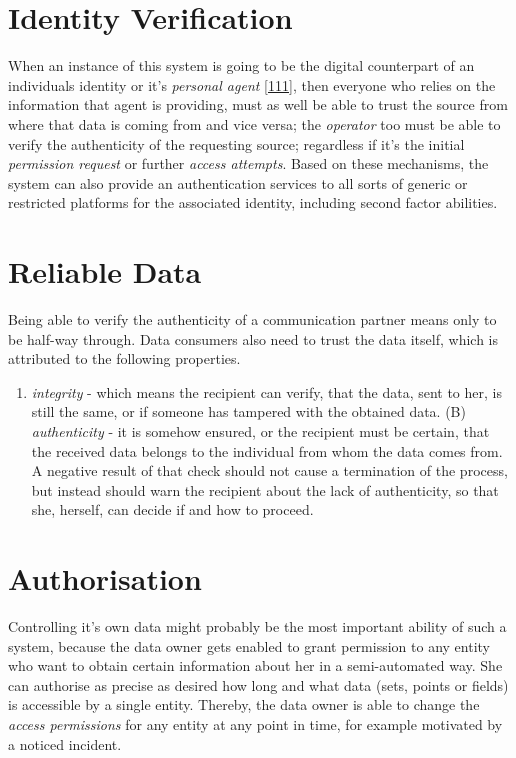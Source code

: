 \documentclass[12pt,english,a4paper,titlepage,cleardoublepage=empty,dottedtoc]{report}
\providecommand{\tightlist}{%
  \setlength{\itemsep}{0pt}\setlength{\parskip}{0pt}}
\begin{document}
\section{Identity Verification}\label{identity-verification}

When an instance of this system is going to be the digital counterpart
of an individuals identity or it's \emph{personal agent}
{[}\protect\hyperlink{ref-book_2015_ethical-it-innovation}{111}{]}, then
everyone who relies on the information that agent is providing, must as
well be able to trust the source from where that data is coming from and
vice versa; the \emph{operator} too must be able to verify the
authenticity of the requesting source; regardless if it's the initial
\emph{permission request} or further \emph{access attempts}. Based on
these mechanisms, the system can also provide an authentication services
to all sorts of generic or restricted platforms for the associated
identity, including second factor abilities.

\section{Reliable Data}\label{reliable-data}

Being able to verify the authenticity of a communication partner means
only to be half-way through. Data consumers also need to trust the data
itself, which is attributed to the following properties.

\begin{enumerate}
\def\labelenumi{(\Alph{enumi})}
\tightlist
\item
  \emph{integrity} - which means the recipient can verify, that the
  data, sent to her, is still the same, or if someone has tampered with
  the obtained data. (B) \emph{authenticity} - it is somehow ensured, or
  the recipient must be certain, that the received data belongs to the
  individual from whom the data comes from. A negative result of that
  check should not cause a termination of the process, but instead
  should warn the recipient about the lack of authenticity, so that she,
  herself, can decide if and how to proceed.
\end{enumerate}

\section{Authorisation}\label{authorisation}

Controlling it's own data might probably be the most important ability
of such a system, because the data owner gets enabled to grant
permission to any entity who want to obtain certain information about
her in a semi-automated way. She can authorise as precise as desired how
long and what data (sets, points or fields) is accessible by a single
entity. Thereby, the data owner is able to change the \emph{access
permissions} for any entity at any point in time, for example motivated
by a noticed incident.
\end{document}
